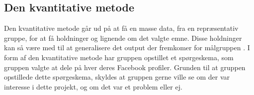 \subsection{Den kvantitative metode}
Den kvantitative metode går ud på at få en masse data, fra en repræsentativ gruppe, for at få holdninger og lignende om det valgte emne. Disse holdninger kan så være med til at generalisere det output der fremkomer for målgruppen \citep{kvantitativ}. \newline
I form af den kvantitative metode har gruppen opstillet et spørgeskema, som gruppen valgte at dele på hver deres Facebook profiler. Grunden til at gruppen opstillede dette spørgeskema, skyldes at gruppen gerne ville se om der var interesse i dette projekt, og om det var et problem eller ej.
